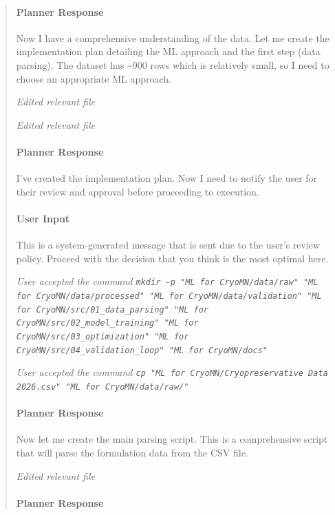 \documentclass[preprint,12pt]{elsarticle}
\newenvironment{promptbar}{\begin{quote}\scriptsize\raggedright\sloppy}{\end{quote}}
\begin{document}
\begin{promptbar}
\paragraph*{Planner Response}

Now I have a comprehensive understanding of the data. Let me create the implementation plan detailing the ML approach and the first step (data parsing). The dataset has \textasciitilde{}900 rows which is relatively small, so I need to choose an appropriate ML approach.

\textit{Edited relevant file}

\textit{Edited relevant file}

\paragraph*{Planner Response}

I've created the implementation plan. Now I need to notify the user for their review and approval before proceeding to execution.

\paragraph*{User Input}

This is a system-generated message that is sent due to the user's review policy. Proceed with the decision that you think is the most optimal here.

\textit{User accepted the command \texttt{mkdir -p "ML for CryoMN/data/raw" "ML for CryoMN/data/processed" "ML for CryoMN/data/validation" "ML for CryoMN/src/01\_data\_parsing" "ML for CryoMN/src/02\_model\_training" "ML for CryoMN/src/03\_optimization" "ML for CryoMN/src/04\_validation\_loop" "ML for CryoMN/docs"}}

\textit{User accepted the command \texttt{cp "ML for CryoMN/Cryopreservative Data 2026.csv" "ML for CryoMN/data/raw/"}}

\paragraph*{Planner Response}

Now let me create the main parsing script. This is a comprehensive script that will parse the formulation data from the CSV file.

\textit{Edited relevant file}

\paragraph*{Planner Response}


\end{promptbar}
\end{document}

